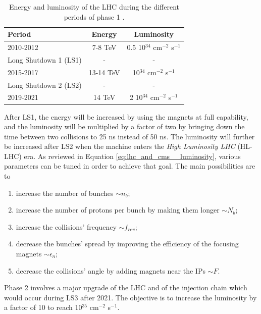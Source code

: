 		\begin{table}[h!]
			\centering
			\begin{tabular}{l|c|c}
				Period & Energy & Luminosity \\ \hline
				2010-2012 & 7-8 TeV & 0.5 10$ ^{34} $ cm$ ^{-2} $ s$ ^{-1} $ \\
				Long Shutdown 1 (LS1) & - & - \\
				2015-2017 & 13-14 TeV & 10$ ^{34} $ cm$ ^{-2} $ s$ ^{-1} $ \\
				Long Shutdown 2 (LS2) & - & - \\
				2019-2021 & 14 TeV & 2 10$ ^{34} $ cm$ ^{-2} $ s$ ^{-1} $
			\end{tabular}
			\caption{Energy and luminosity of the LHC during the different periods of phase 1 \Cite{LHC_Machine}.}
			\label{tab:lhc_and_cms__lhc_performances}
		\end{table}

		After LS1, the energy will be increased by using the magnets at full capability, and the luminosity will be multiplied by a factor of two by bringing down the time between two collisions to 25 ns instead of 50 ns. The luminosity will further be increased after LS2 when the machine enters the \emph{High Luminosity LHC} (HL-LHC) era. As reviewed in Equation \ref{eq:lhc_and_cms__luminosity}, various parameters can be tuned in order to achieve that goal. The main possibilities are to \Cite{LHC_LS1, LHC_Upgrade_Scenarios}
		\begin{enumerate}
			\item increase the number of bunches $ \sim n_b $;
			\item increase the number of protons per bunch by making them longer $ \sim N_b $;
			\item increase the collisions' frequency $ \sim f_{rev} $;
			\item decrease the bunches' spread by improving the efficiency of the focusing magnets $ \sim \epsilon_n $;
			\item decrease the collisions' angle by adding magnets near the IPs $ \sim F $. \\
		\end{enumerate}

		Phase 2 involves a major upgrade of the LHC and of the injection chain which would occur during LS3 after 2021. The objective is to increase the luminosity by a factor of 10 to reach 10$ ^{35} $ cm$ ^{-2} $ s$ ^{-1} $.
